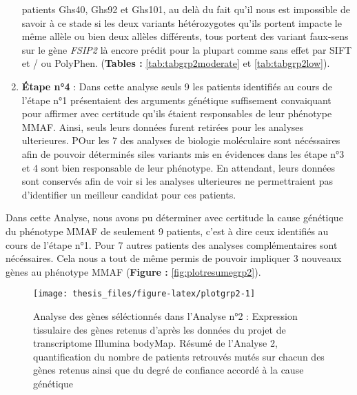 \documentclass[12pt,twoside]{reedthesis}
\theoremstyle{definition}
\theoremstyle{definition}
\theoremstyle{remark}
\begin{document}
\begin{enumerate}
    patients Ghs40, Ghs92 et Ghs101, au delà du fait qu'il nous est
    impossible de savoir à ce stade si les deux variants hétérozygotes
    qu'ils portent impacte le même allèle ou bien deux allèles différents,
    tous portent des variant faux-sens sur le gène \emph{FSIP2} là encore
    prédit pour la plupart comme sans effet par SIFT et / ou PolyPhen.
    (\textbf{Tables : }\ref{tab:tabgrp2moderate} et \ref{tab:tabgrp2low}).
  \item
    \textbf{Étape n°4} : Dans cette analyse seuls 9 les patients
    identifiés au cours de l'étape n°1 présentaient des arguments
    génétique suffisement convaiquant pour affirmer avec certitude qu'ils
    étaient responsables de leur phénotype MMAF. Ainsi, seuls leurs
    données furent retirées pour les analyses ulterieures. POur les 7 des
    analyses de biologie moléculaire sont nécéssaires afin de pouvoir
    déterminés siles variants mis en évidences dans les étape n°3 et 4
    sont bien responsable de leur phénotype. En attendant, leurs données
    sont conservés afin de voir si les analyses ulterieures ne
    permettraient pas d'identifier un meilleur candidat pour ces patients.
  \end{enumerate}
  
  Dans cette Analyse, nous avons pu déterminer avec certitude la cause
  génétique du phénotype MMAF de seulement 9 patients, c'est à dire ceux
  identifiés au cours de l'étape n°1. Pour 7 autres patients des analyses
  complémentaires sont nécéssaires. Cela nous a tout de même permis de
  pouvoir impliquer 3 nouveaux gènes au phénotype MMAF (\textbf{Figure :}
  \ref{fig:plotresumegrp2}).
  
  \newpage  
  
  \begin{figure}
  
  {\centering \texttt{[image: thesis\_files/figure-latex/plotgrp2-1]} 
  
  }
  
  \caption[Analyse des gènes séléctionnés dans l'Analyse n°2]{Analyse des gènes séléctionnés dans l'Analyse n°2 : Expression tissulaire des gènes retenus d'après les données du projet de transcriptome Illumina bodyMap. Résumé de l'Analyse 2, quantification du nombre de patients retrouvés mutés sur chacun des gènes retenus ainsi que du degré de confiance accordé à la cause génétique}\label{fig:plotgrp2}
  \end{figure}
  
  \newpage  
  
\end{document}
